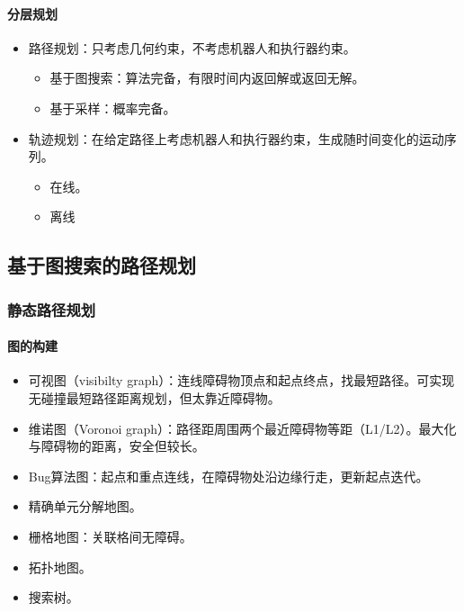 \documentclass[
12pt, %
a4paper, 
oneside, %
headinclude,footinclude, %
]{scrartcl}
\begin{document}
\paragraph{分层规划}
\begin{itemize}
\item 路径规划：只考虑几何约束，不考虑机器人和执行器约束。
\begin{itemize}
\item 基于图搜索：算法完备，有限时间内返回解或返回无解。
\item 基于采样：概率完备。
\end{itemize}
\item 轨迹规划：在给定路径上考虑机器人和执行器约束，生成随时间变化的运动序列。
\begin{itemize}
\item 在线。
\item 离线
\end{itemize}
\end{itemize}
\subsection[基于图搜索的路径规划]{基于图搜索的路径规划}
\subsubsection[静态路径规划]{静态路径规划}
\paragraph{图的构建}
\begin{itemize}
\item 可视图（visibilty graph）：连线障碍物顶点和起点终点，找最短路径。可实现无碰撞最短路径距离规划，但太靠近障碍物。
\item 维诺图（Voronoi graph）：路径距周围两个最近障碍物等距（L1/L2）。最大化与障碍物的距离，安全但较长。
\item Bug算法图：起点和重点连线，在障碍物处沿边缘行走，更新起点迭代。
\item 精确单元分解地图。
\item 栅格地图：关联格间无障碍。
\item 拓扑地图。
\item 搜索树。
\end{itemize}
\end{document}
